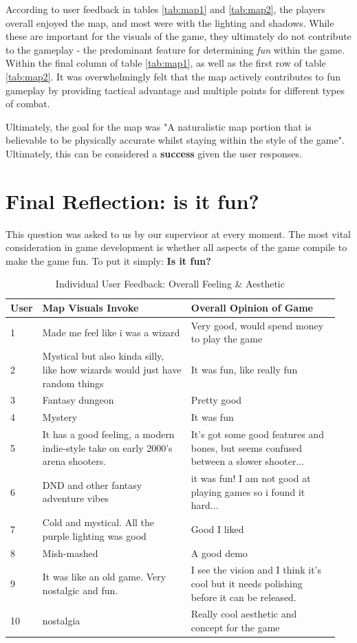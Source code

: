 \documentclass[12pt,a4paper]{report}
\begin{document}
According to user feedback in tables \ref{tab:map1} and \ref{tab:map2}, the players overall enjoyed the map, and most were with the lighting and shadows. While these are important for the visuals of the game, they ultimately do not contribute to the gameplay - the predominant feature for determining \textit{fun} within the game. Within the final column of table \ref{tab:map1}, as well as the first row of table \ref{tab:map2}. It was overwhelmingly felt that the map actively contributes to fun gameplay by providing tactical advantage and multiple points for different types of combat.

Ultimately, the goal for the map was "A naturalistic map portion that is believable to be physically accurate whilst staying within the style of the game". Ultimately, this can be considered a \textbf{success} given the user responses.

\section{Final Reflection: is it fun?}

This question was asked to us by our supervisor at every moment. The most vital consideration in game development is whether all aspects of the game compile to make the game fun. To put it simply: \textbf{Is it fun?}

\begin{table}[h]
\centering
\caption{Individual User Feedback: Overall Feeling \& Aesthetic}
\label{tab:fun1}
\begin{tabular}{p{0.05\linewidth} p{0.45\linewidth} p{0.45\linewidth}}
\hline
\textbf{User} & \textbf{Map Visuals Invoke} & \textbf{Overall Opinion of Game} \\
\hline
1 & Made me feel like i was a wizard & Very good, would spend money to play the game \\
2 & Mystical but also kinda silly, like how wizards would just have random things & It was fun, like really fun \\
3 & Fantasy dungeon & Pretty good \\
4 & Mystery & It was fun \\
5 & It has a good feeling, a modern indie-style take on early 2000's arena shooters. & It's got some good features and bones, but seems confused between a slower shooter... \\
6 & DND and other fantasy adventure vibes & it was fun! I am not good at playing games so i found it hard... \\
7 & Cold and mystical. All the purple lighting was good & Good I liked \\
8 & Mish-mashed & A good demo \\
9 & It was like an old game. Very nostalgic and fun. & I see the vision and I think it's cool but it needs polishing before it can be released. \\
10 & nostalgia & Really cool aesthetic and concept for the game \\
\hline
\end{tabular}
\end{table}
\end{document}

